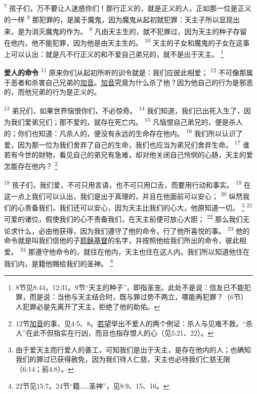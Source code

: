 \textsuperscript{7}
孩子们，万不要让人迷惑你们！那行正义的，就是正义的人，正如那一位是正义的一样
\textsuperscript{8}
那犯罪的，是属于魔鬼，因为魔鬼从起初就犯罪：天主子所以显现出来，是为消灭魔鬼的作为。
\textsuperscript{9}
凡由天主生的，就不犯罪过，因为天主的种子存留在他内，他不能犯罪，因为他是由天主生的。
\textsuperscript{10}
天主的子女和魔鬼的子女在这事上可以认出：就是凡不行正义的和不爱自己弟兄的，就不是出于天主。
\footnote{8节见8:44，12:31。9节“天主的种子”，即指圣宠。此处不是说：信友已不能犯罪，而是说：当他与天主结合时，既与罪过势不两立，哪能再犯罪？（6节）人犯罪必是先离开了天主，拒绝了他的助佑。}

\textbf{爱人的命令\quad}
\textsuperscript{11}
原来你们从起初所听的训令就是：我们应彼此相爱；
\textsuperscript{12}
不可像那属于恶者和杀害自己兄弟的\uline{加音}。\uline{加音}究竟为什么杀了他？因为他自己的行为是邪恶的，而他兄弟的行为是正义的。

\textsuperscript{13}
弟兄们，如果世界恼恨你们，不必惊奇。
\textsuperscript{14}
我们知道，我们已出死入生了，因为我们爱弟兄们；那不爱的，就存在死亡内。
\textsuperscript{15}
凡恼恨自己弟兄的，便是杀人的；你们也知道：凡杀人的，便没有永远的生命存在他内。
\textsuperscript{16}
我们所以认识了爱，因为那一位为我们舍弃了自己的生命，我们也应当为弟兄们舍弃生命。
\textsuperscript{17}
谁若有今世的财物，看见自己的弟兄有急难，却对他关闭自己怜悯的心肠，天主的爱怎能存在他内？
\footnote{12节\uline{加音}的事，见4:5、8。\uline{若望}举出不爱人的两个例证：杀人与见难不救。“杀人”在此不但指实在行凶，而且也指存恨人的心（见5:21、22）。}

\textsuperscript{18}
孩子们，我们爱，不可只用言语，也不可只用口舌，而要用行动和事实。
\textsuperscript{19}
在这一点上我们可以认出，我们是出于真理的，并且在他面前可以安心；
\textsuperscript{20}
纵然我们的心责备我们，我们还可以安心，因为天主比我们的心大，他原知道一切。
\footnote{由于爱天主而行爱人的善工，可知我们是出于天主，是存在他内的人；也确知我们的罪过已获得赦免，因为我们待人仁慈，天主也必待我们仁慈无限（6:14；前4:8）。}
\textsuperscript{21}
可爱的诸位，假使我们的心不责备我们，在天主前便可放心大胆；
\textsuperscript{22}
那么我们无论求什么，必由他获得，因为我们遵守了他的命令，行了他所喜悦的事。
\textsuperscript{23}
他的命令就是叫我们信他的子\uline{耶稣}\uline{基督}的名字，并按照他给我们所出的命令，彼此相爱。
\textsuperscript{24}
那遵守他命令的，就往在他内，天主也住在这人内。我们所以知道他住在我们内，是籍他赐给我们的圣神。
\footnote{22节见15:7。24节“籍……圣神”，见8:9、15、16。}

